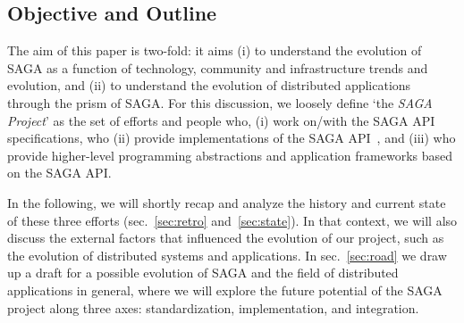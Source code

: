 \documentclass{article}
\newcommand{\I}[1]{\textit{#1}}
\begin{document}
\subsection{Objective and Outline} 
The aim of this paper is two-fold: it aims (i) to understand the
evolution of SAGA as a function of technology, community and
infrastructure trends and evolution, and (ii) to understand the
evolution of distributed applications through the prism of SAGA.  For
this discussion, we loosely define `the \I{SAGA Project}' as the set
of efforts and people who, (i) work on/with the SAGA API
specifications\cite{ogf-gfd-90}, who (ii) provide implementations of
the SAGA API~\cite{Kaiser:2006qp,jsaga,javasaga}, and (iii) who
provide higher-level programming abstractions and application
frameworks based on the SAGA
API\cite{bigjob_cloudcom10,fresh-dag-escience,Sehgal2011590}.

In the following, we will shortly recap and analyze the history and
current state of these three efforts (sec.~\ref{sec:retro}
and~\ref{sec:state}). In that context, we will also discuss the
external factors that influenced the evolution of our project, such as
the evolution of distributed systems and applications.  In
sec.~\ref{sec:road} we draw up a draft for a possible evolution of
SAGA and the field of distributed applications in general, where we
will explore the future potential of the SAGA project along three
axes: standardization, implementation, and integration.
 

 
\end{document}
